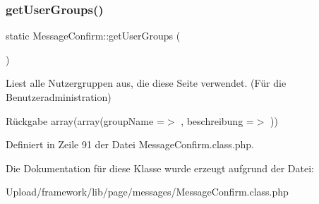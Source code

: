 \subsubsection{\texorpdfstring{get\+User\+Groups()}{getUserGroups()}}
{\footnotesize\ttfamily static Message\+Confirm\+::get\+User\+Groups (\begin{DoxyParamCaption}{ }\end{DoxyParamCaption})\hspace{0.3cm}{\ttfamily [static]}}

Liest alle Nutzergruppen aus, die diese Seite verwendet. (Für die Benutzeradministration) \begin{DoxyReturn}{Rückgabe}
array(array(\textquotesingle{}group\+Name\textquotesingle{} =$>$ \textquotesingle{}\textquotesingle{}, \textquotesingle{}beschreibung\textquotesingle{} =$>$ \textquotesingle{}\textquotesingle{})) 
\end{DoxyReturn}


Definiert in Zeile 91 der Datei Message\+Confirm.\+class.\+php.



Die Dokumentation für diese Klasse wurde erzeugt aufgrund der Datei\+:\begin{DoxyCompactItemize}
\item 
Upload/framework/lib/page/messages/Message\+Confirm.\+class.\+php\end{DoxyCompactItemize}
